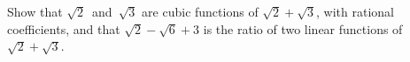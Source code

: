 Show that $\sqrt{2}$~and~$\sqrt{3}$ are cubic functions of $\sqrt{2} + \sqrt{3}$, with rational
coefficients, and that $\sqrt{2} - \sqrt{6} + 3$ is the ratio of two linear functions of
$\sqrt{2} + \sqrt{3}$. 

